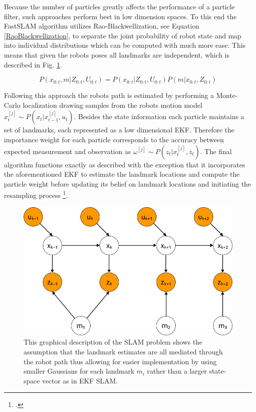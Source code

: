 Because the number of particles greatly affects the performance of a particle filter, such approaches perform best in low dimension spaces. To this end the FastSLAM algorithm utilizes Rao-Blackwellization, see Equation \ref{RaoBlackwellization}, to separate the joint probability of robot state and map into individual distributions which can be computed with much more ease.
This means that given the robots poses all landmarks are independent, which is described in Fig. \ref{fig:fastSlamGraphical}.

\begin{equation}\label{RaoBlackwellization}
	P(x_{0:t}, m | Z_{0:t}, U_{0:t}) = P(x_{0:t} | Z_{0:t}, U_{0:t}) P(m | x_{0:t}, Z_{0:t})
\end{equation}

Following this approach the robots path is estimated by performing a Monte-Carlo localization drawing samples from the robots motion model $x_{t}^{[j]} \sim P(x_{t} | x_{t-1}^{[j]}, u_{t}) $. Besides the state information each particle maintains a set of landmarks, each represented as a low dimensional EKF. Therefore the importance weight for each particle corresponds to the accuracy between expected measurement and observation as $ \omega^{[j]} \sim P(z_{t} | x_{t}^{[j]}, \overline{z}_{t}) $.
The final algorithm functions exactly as described with the exception that it incorporates the aforementioned EKF to estimate the landmark locations and compute the particle weight before updating its belief on landmark locations and initiating the resampling process \footcite[Pages 1159-1162]{stachniss2016simultaneous}. 


\begin{figure}
	\centering
	\includegraphics[width=0.5\linewidth]{img/FastSlamGraphical}
	\caption{
		This graphical description of the SLAM problem shows the assumption that the landmark estimates are all mediated through the robot path thus allowing for easier implementation by using smaller Gaussians for each landmark $m_{i}$ rather than a larger state-space vector as in EKF SLAM.
	}
	\label{fig:fastSlamGraphical}
\end{figure}

